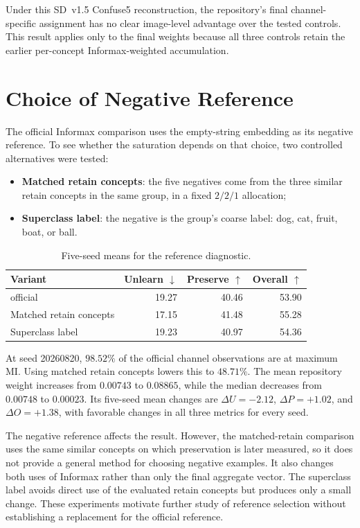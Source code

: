 \documentclass[11pt]{article}
\begin{document}
Under this SD~v1.5 Confuse5 reconstruction, the repository's final channel-specific assignment has no clear image-level advantage over the tested controls. This result applies only to the final weights because all three controls retain the earlier per-concept Informax-weighted accumulation.

\section{Choice of Negative Reference}
\label{sec:reference}
The official Informax comparison uses the empty-string embedding as its negative reference. To see whether the saturation depends on that choice, two controlled alternatives were tested:
\begin{itemize}
    \item \textbf{Matched retain concepts}: the five negatives come from the three similar retain concepts in the same group, in a fixed $2/2/1$ allocation;
    \item \textbf{Superclass label}: the negative is the group's coarse label: dog, cat, fruit, boat, or ball.
\end{itemize}

\begin{table}[H]
\centering
\caption{Five-seed means for the reference diagnostic.}
\begin{tabular}{lrrr}
\toprule
Variant & Unlearn $\downarrow$ & Preserve $\uparrow$ & Overall $\uparrow$ \\
\midrule
official & 19.27 & 40.46 & 53.90 \\
Matched retain concepts & 17.15 & 41.48 & 55.28 \\
Superclass label & 19.23 & 40.97 & 54.36 \\
\bottomrule
\end{tabular}
\end{table}

At seed 20260820, $98.52\%$ of the official channel observations are at maximum MI. Using matched retain concepts lowers this to $48.71\%$. The mean repository weight increases from $0.00743$ to $0.08865$, while the median decreases from $0.00748$ to $0.00023$. Its five-seed mean changes are $\Delta U=-2.12$, $\Delta P=+1.02$, and $\Delta O=+1.38$, with favorable changes in all three metrics for every seed.

The negative reference affects the result. However, the matched-retain comparison uses the same similar concepts on which preservation is later measured, so it does not provide a general method for choosing negative examples. It also changes both uses of Informax rather than only the final aggregate vector. The superclass label avoids direct use of the evaluated retain concepts but produces only a small change. These experiments motivate further study of reference selection without establishing a replacement for the official reference.
\end{document}
